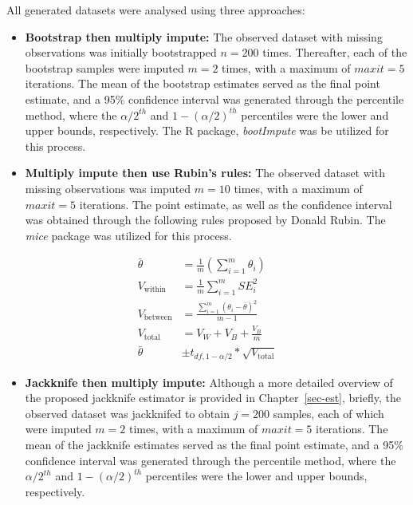 \documentclass[
  letterpaper,
  DIV=11,
  numbers=noendperiod]{scrreprt}
\providecommand{\tightlist}{%
  \setlength{\itemsep}{0pt}\setlength{\parskip}{0pt}}\usepackage{longtable,booktabs,array}
\begin{document}
All generated datasets were analysed using three approaches:

\begin{itemize}
\item
  \textbf{Bootstrap then multiply impute:} The observed dataset with
  missing observations was initially bootstrapped \(n = 200\) times.
  Thereafter, each of the bootstrap samples were imputed \(m = 2\)
  times, with a maximum of \(maxit = 5\) iterations. The mean of the
  bootstrap estimates served as the final point estimate, and a 95\%
  confidence interval was generated through the percentile method, where
  the \(\alpha/2^{th}\) and \(1-(\alpha/2)^{th}\) percentiles were the
  lower and upper bounds, respectively. The R package, \emph{bootImpute}
  was be utilized for this process.
\item
  \textbf{Multiply impute then use Rubin's rules:} The observed dataset
  with missing observations was imputed \(m = 10\) times, with a maximum
  of \(maxit = 5\) iterations. The point estimate, as well as the
  confidence interval was obtained through the following rules proposed
  by Donald Rubin. The \emph{mice} package was utilized for this
  process.
\end{itemize}

\begin{align}
\bar{\theta} &= \frac{1}{m}\left (\sum_{i=1}^m{\theta_i}\right ) \\ 
V_{\text{within}} &= \frac{1}{m} \sum_{i=1}^m{SE_i^2} \\ 
V_{\text{between}} &= \frac{\sum_{i=1}^m (\theta_i - \overline{\theta})^2}{m-1} \\ 
V_{\text{total}} &= V_W + V_B + \frac{V_B}{m} \\ 
\bar{\theta} &\pm t_{df,1-\alpha/2} * \sqrt{V_{\text{total}}} 
\end{align}

\begin{itemize}
\tightlist
\item
  \textbf{Jackknife then multiply impute:} Although a more detailed
  overview of the proposed jackknife estimator is provided in
  Chapter~\ref{sec-est}, briefly, the observed dataset was jackknifed to
  obtain \(j = 200\) samples, each of which were imputed \(m = 2\)
  times, with a maximum of \(maxit = 5\) iterations. The mean of the
  jackknife estimates served as the final point estimate, and a 95\%
  confidence interval was generated through the percentile method, where
  the \(\alpha/2^{th}\) and \(1-(\alpha/2)^{th}\) percentiles were the
  lower and upper bounds, respectively.
\end{itemize}
\end{document}
